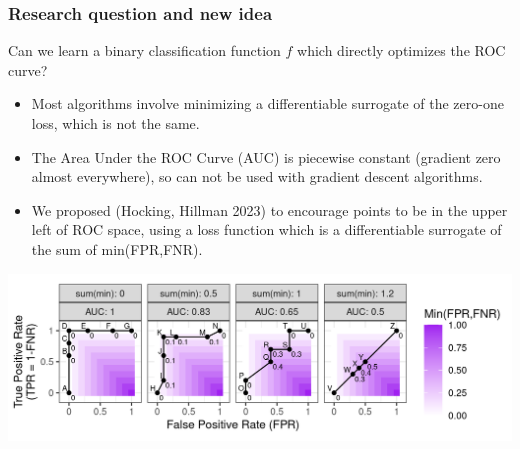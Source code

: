\documentclass[t]{beamer}
\begin{document}
\begin{frame}
  \frametitle{Research question and new idea}
  Can we learn a binary classification function $f$ which directly
  optimizes the ROC curve?
  \begin{itemize}
  \item Most algorithms involve minimizing a differentiable surrogate
    of the zero-one loss, which is not the same.
  \item The Area Under the ROC Curve (AUC) is piecewise constant
    (gradient zero almost everywhere), so can not be used with
    gradient descent algorithms.
  \item We proposed (Hocking, Hillman 2023) to encourage points to be in the upper left of ROC
    space, using a loss function which is a differentiable surrogate
    of the sum of min(FPR,FNR).
  \end{itemize}
  \includegraphics[width=\textwidth]{figure-more-than-one-new-binary-heat}
\end{frame}
 
\end{document}
